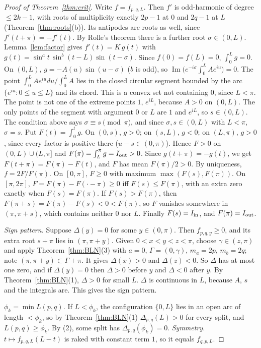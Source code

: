 \documentclass[11pt]{amsart}
\theoremstyle{definition}
\begin{document}
\begin{proof}[Proof of Theorem~\ref{thm:crit}]
Write $f=f_{p,q,L}$. Then $f'$ is odd-harmonic of degree $\le2k-1$, with roots of multiplicity exactly $2p-1$ at $0$ and $2q-1$ at $L$
(Theorem~\ref{thm:roots}(b)). Its antipodes are roots as well, since $f'(t+\pi)=-f'(t)$. By Rolle's theorem there is a further root
$\sigma\in(0,L)$. Lemma~\ref{lem:factor} gives $f'(t)=K\,g(t)$ with $g(t)=\sin^at\,\sin^b(t-L)\sin(t-\sigma)$. Since $f(0)=f(L)=0$,
$\int_0^Lg=0$. On $(0,L)$, $g=-A(u)\sin(u-\sigma)$ ($b$ is odd), so $\operatorname{Im}\big(e^{-i\sigma}\int_0^LAe^{iu}\big)=0$.
The point $\int_0^LAe^{iu}du/\int_0^LA$ lies in the closed circular segment bounded by the arc $\{e^{iu}:0\le u\le L\}$ and its chord. This
is a convex set not containing $0$, since $L<\pi$. The point is not one of the extreme points $1$, $e^{iL}$, because $A>0$ on $(0,L)$. The only
points of the segment with argument $0$ or $L$ are $1$ and $e^{iL}$, so $s\in(0,L)$. The condition above says $\sigma\equiv s\pmod\pi$, and since
$\sigma,s\in(0,L)$ with $L<\pi$, $\sigma=s$. Put $F(t)=\int_0^tg$. On $(0,s)$, $g>0$; on $(s,L)$, $g<0$; on $(L,\pi)$, $g>0$, since every
factor is positive there ($u-s\in(0,\pi)$). Hence $F>0$ on $(0,L)\cup(L,\pi]$ and $F(\pi)=\int_L^\pi g=I_{\rm out}>0$.
Since $g(t+\pi)=-g(t)$, we get $F(t+\pi)=F(\pi)-F(t)$, and $F$ has mean $F(\pi)/2>0$. By uniqueness, $f=2F/F(\pi)$.
On $[0,\pi]$, $F\ge0$ with maximum $\max(F(s),F(\pi))$. On $[\pi,2\pi]$, $F=F(\pi)-F(\cdot-\pi)\ge0$ iff $F(s)\le F(\pi)$, with an
extra zero exactly when $F(s)=F(\pi)$. If $F(s)>F(\pi)$, then $F(\pi+s)=F(\pi)-F(s)<0<F(\pi)$, so $F$ vanishes somewhere in $(\pi,\pi+s)$, which
contains neither $0$ nor $L$. Finally $F(s)=I_{\rm in}$, and $F(\pi)=I_{\rm out}$.

\emph{Sign pattern.} Suppose $\Delta(y)=0$ for some $y\in(0,\pi)$. Then $f_{p,q,y}\ge0$, and its extra root $s+\pi$ lies in $(\pi,\pi+y)$.
Given $0<x<y<z<\pi$, choose $\gamma\in(z,\pi)$ and apply Theorem~\ref{thm:BLN}(3) with $a=0$, $\Gamma=(0,\gamma)$, $m_a=2p$, $m_b=2q$; note
$(\pi,\pi+y)\subset\Gamma+\pi$. It gives $\Delta(x)>0$ and $\Delta(z)<0$. So $\Delta$ has at most one zero, and if $\Delta(y)=0$ then
$\Delta>0$ before $y$ and $\Delta<0$ after $y$. By Theorem~\ref{thm:BLN}(1), $\Delta>0$ for small $L$. $\Delta$ is continuous in $L$, because
$A$, $s$ and the integrals are. This gives the sign pattern.

\emph{$\phi_k=\min L(p,q)$.} If $L<\phi_k$, the configuration $\{0,L\}$ lies in an open arc of length $<\phi_k$, so by
Theorem~\ref{thm:BLN}(1) $\Delta_{p,q}(L)>0$ for every split, and $L(p,q)\ge\phi_k$. By (2), some split has $\Delta_{p,q}(\phi_k)=0$.
\emph{Symmetry.} $t\mapsto f_{p,q,L}(L-t)$ is raked with constant term $1$, so it equals $f_{q,p,L}$.
\end{proof}
\end{document}
